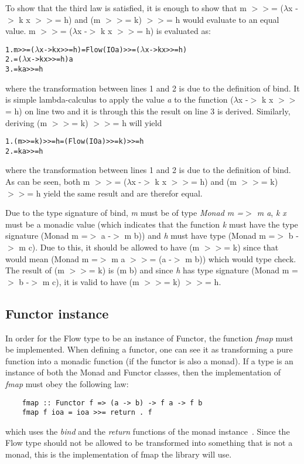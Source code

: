 To show that the third law is satisfied, it is enough to show that m \(>>\)= (\(\lambda\)x -\(>\) k x \(>>\)= h) and (m \(>>\)= k) \(>>\)= h would evaluate to an equal value. m \(>>\)= (\(\lambda\)x -\(>\) k x \(>>\)= h) is evaluated as:
\begin{alltt}
  1. m >>= (\(\lambda\)x -> k x >>= h) = Flow (IO a) >>= (\(\lambda\)x -> k x >>= h)
  2.                                   = (\(\lambda\)x -> k x >>= h) a
  3.                                   = k a >>= h
\end{alltt}
where the transformation between lines 1 and 2 is due to the definition of bind. It is simple lambda-calculus to apply the value \emph{a} to the function (\(\lambda\)x -\(>\) k x \(>>\)= h) on line two and it is through this the result on line 3 is derived.
\newline
\newline
Similarly, deriving (m \(>>\)= k) \(>>\)= h will yield
\begin{alltt}
  1. (m >>= k) >>= h = (Flow (IO a) >>= k) >>= h
  2.                 = k a >>= h
\end{alltt}
where the transformation between lines 1 and 2 is due to the definition of bind. As can be seen, both m \(>>\)= (\(\lambda\)x -\(>\) k x \(>>\)= h) and (m \(>>\)= k) \(>>\)= h yield the same result and are therefor equal.

Due to the type signature of bind, \emph{m} must be of type \emph{Monad m =\(>\) m a}, \emph{k x} must be a monadic value (which indicates that the function \emph{k} must have the type signature (Monad m =\(>\) a -\(>\) m b)) and \emph{h} must have type (Monad m =\(>\) b -\(>\) m c). Due to this, it should be allowed to have (m \(>>\)= k) since that would mean (Monad m =\(>\) m a \(>>\)= (a -\(>\) m b)) which would type check. The result of (m \(>>\)= k) is (m b) and since \emph{h} has type signature (Monad m =\(>\) b -\(>\) m c), it is valid to have (m \(>>\)= k) \(>>\)= h.
\subsection{Functor instance}
In order for the Flow type to be an instance of Functor, the function \emph{fmap} must be implemented. When defining a functor, one can see it as transforming a pure function into a monadic function (if the functor is also a monad). If a type is an instance of both the Monad and Functor classes, then the implementation of \emph{fmap} must obey the following law:
\begin{verbatim}
    fmap :: Functor f => (a -> b) -> f a -> f b
    fmap f ioa = ioa >>= return . f
\end{verbatim}
which uses the \emph{bind} and the \emph{return} functions of the monad instance~\cite{functor-monad-law}. Since the Flow type should not be allowed to be transformed into something that is not a monad, this is the implementation of fmap the library will use.
